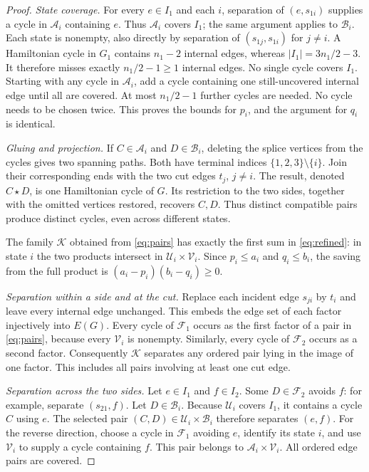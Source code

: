 \begin{proof}
\emph{State coverage.}
For every $e\in I_1$ and each $i$, separation of $(e,s_{1i})$ supplies a
cycle in $\mathcal A_i$ containing $e$. Thus $\mathcal A_i$ covers $I_1$;
the same argument applies to $\mathcal B_i$. Each state is nonempty, also
directly by separation of $(s_{1j},s_{1i})$ for $j\ne i$.
A Hamiltonian cycle in $G_1$ contains $n_1-2$ internal edges, whereas
$|I_1|=3n_1/2-3$. It therefore misses exactly $n_1/2-1\ge1$ internal edges.
No single cycle covers $I_1$. Starting with any cycle in $\mathcal A_i$,
add a cycle containing one still-uncovered internal edge until all are covered.
At most $n_1/2-1$ further cycles are needed. No cycle needs to be chosen twice.
This proves the bounds for $p_i$, and the argument for $q_i$ is identical.

\emph{Gluing and projection.}
If $C\in\mathcal A_i$ and $D\in\mathcal B_i$, deleting the splice vertices
from the cycles gives two spanning paths. Both have terminal indices
$\{1,2,3\}\setminus\{i\}$. Join their corresponding ends with the two
cut edges $t_j$, $j\ne i$. The result, denoted $C\star D$, is one Hamiltonian
cycle of $G$. Its restriction to the two sides, together with the omitted
vertices restored, recovers $C,D$. Thus distinct compatible pairs produce
distinct cycles, even across different states.

The family $\mathcal K$ obtained from \eqref{eq:pairs} has exactly the first
sum in \eqref{eq:refined}: in state $i$ the two products intersect in
$\mathcal U_i\times\mathcal V_i$. Since $p_i\le a_i$ and $q_i\le b_i$,
the saving from the full product is
$(a_i-p_i)(b_i-q_i)\ge0$.

\emph{Separation within a side and at the cut.}
Replace each incident edge $s_{ji}$ by $t_i$ and leave every internal edge
unchanged. This embeds the edge set of each factor injectively into $E(G)$.
Every cycle of $\mathcal F_1$ occurs as the first factor of a pair in
\eqref{eq:pairs}, because every $\mathcal V_i$ is nonempty. Similarly, every
cycle of $\mathcal F_2$ occurs as a second factor. Consequently $\mathcal K$
separates any ordered pair lying in the image of one factor. This includes
all pairs involving at least one cut edge.

\emph{Separation across the two sides.}
Let $e\in I_1$ and $f\in I_2$. Some $D\in\mathcal F_2$ avoids $f$:
for example, separate $(s_{21},f)$. Let $D\in\mathcal B_i$.
Because $\mathcal U_i$ covers $I_1$, it contains a cycle $C$ using $e$.
The selected pair $(C,D)\in\mathcal U_i\times\mathcal B_i$ therefore
separates $(e,f)$. For the reverse direction, choose a cycle in
$\mathcal F_1$ avoiding $e$, identify its state $i$, and use
$\mathcal V_i$ to supply a cycle containing $f$. This pair belongs to
$\mathcal A_i\times\mathcal V_i$. All ordered edge pairs are covered.
\end{proof}

